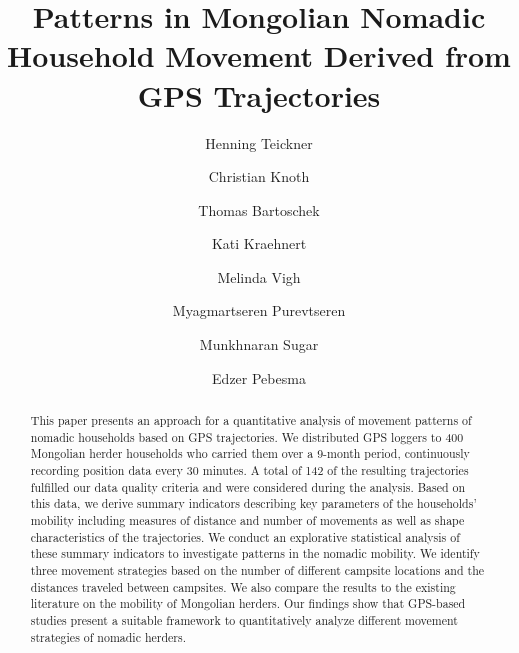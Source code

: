\documentclass[]{elsarticle} %
\begin{document}
\begin{frontmatter}

  \title{Patterns in Mongolian Nomadic Household Movement Derived from
GPS Trajectories}
    \author[ifgi]{Henning Teickner}
    \author[ifgi]{Christian Knoth}
    \author[ifgi]{Thomas Bartoschek}
  
    \author[picir]{Kati Kraehnert}
  
    \author[feba]{Melinda Vigh}
  
    \author[dgnum]{Myagmartseren Purevtseren}
  
    \author[dgnum]{Munkhnaran Sugar}
  
    \author[ifgi]{Edzer Pebesma}
  
      \address[ifgi]{Institute for Geoinformatics, University of
Münster, Heisenbergstraße 2, DE-48149}
    \address[picir]{Potsdam Institute for Climate Impact Research}
    \address[feba]{Faculty of Economics and Business Administration,
Vrije Universiteit Amsterdam}
    \address[dgnum]{Department of Geography, National University of
Mongolia}
  
  \begin{abstract}
  This paper presents an approach for a quantitative analysis of
  movement patterns of nomadic households based on GPS trajectories. We
  distributed GPS loggers to 400 Mongolian herder households who carried
  them over a 9-month period, continuously recording position data every
  30 minutes. A total of 142 of the resulting trajectories fulfilled our
  data quality criteria and were considered during the analysis. Based
  on this data, we derive summary indicators describing key parameters
  of the households' mobility including measures of distance and number
  of movements as well as shape characteristics of the trajectories. We
  conduct an explorative statistical analysis of these summary
  indicators to investigate patterns in the nomadic mobility. We
  identify three movement strategies based on the number of different
  campsite locations and the distances traveled between campsites. We
  also compare the results to the existing literature on the mobility of
  Mongolian herders. Our findings show that GPS-based studies present a
  suitable framework to quantitatively analyze different movement
  strategies of nomadic herders.
  \end{abstract}
  
 \end{frontmatter}
\end{document}
